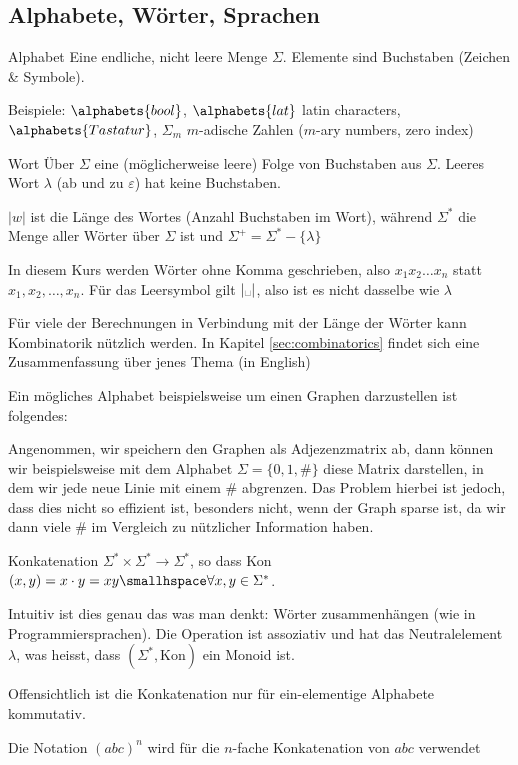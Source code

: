 \subsection{Alphabete, Wörter, Sprachen}

\begin{definition}[]{Alphabet}
    Eine endliche, nicht leere Menge $\Sigma$. Elemente sind Buchstaben (Zeichen \& Symbole). 

    Beispiele: $\alphabets{bool}$, $\alphabets{lat}$ latin characters, $\alphabets{Tastatur}$, $\Sigma_m$ $m$-adische Zahlen ($m$-ary numbers, zero index)
\end{definition}

\begin{definition}[]{Wort}
    Über $\Sigma$ eine (möglicherweise leere) Folge von Buchstaben aus $\Sigma$. Leeres Wort $\lambda$ (ab und zu $\varepsilon$) hat keine Buchstaben.

    $|w|$ ist die Länge des Wortes (Anzahl Buchstaben im Wort), während $\Sigma^*$ die Menge aller Wörter über $\Sigma$ ist und $\Sigma^+ = \Sigma^* - \{\lambda\}$

    In diesem Kurs werden Wörter ohne Komma geschrieben, also $x_1x_2\ldots x_n$ statt $x_1, x_2, \ldots, x_n$.
    Für das Leersymbol gilt $|\text{\textvisiblespace}|$, also ist es nicht dasselbe wie $\lambda$
\end{definition}

Für viele der Berechnungen in Verbindung mit der Länge der Wörter kann Kombinatorik nützlich werden. 
In Kapitel \ref{sec:combinatorics} findet sich eine Zusammenfassung über jenes Thema (in English)

Ein mögliches Alphabet beispielsweise um einen Graphen darzustellen ist folgendes: 

Angenommen, wir speichern den Graphen als Adjezenzmatrix ab, dann können wir beispielsweise mit dem Alphabet $\Sigma = \{0, 1, \#\}$ diese Matrix darstellen, in dem wir jede neue Linie mit einem $\#$ abgrenzen.
Das Problem hierbei ist jedoch, dass dies nicht so effizient ist, besonders nicht, wenn der Graph sparse ist, da wir dann viele \# im Vergleich zu nützlicher Information haben.

\begin{definition}[]{Konkatenation}
    $\Sigma^* \times \Sigma^* \rightarrow \Sigma^*$, so dass Kon$(x, y) = x \cdot y = xy \smallhspace \forall x, y \in \Sigma^*$.

    Intuitiv ist dies genau das was man denkt: Wörter zusammenhängen (wie in Programmiersprachen). 
    Die Operation ist assoziativ und hat das Neutralelement $\lambda$, was heisst, dass $(\Sigma^*, \text{Kon})$ ein Monoid ist.

    Offensichtlich ist die Konkatenation nur für ein-elementige Alphabete kommutativ.

    Die Notation $(abc)^n$ wird für die $n$-fache Konkatenation von $abc$ verwendet
\end{definition}


